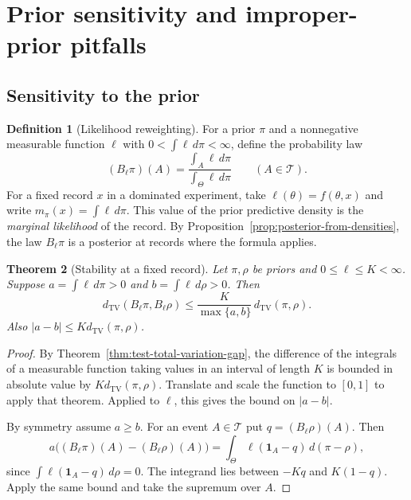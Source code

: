 \documentclass[11pt,oneside]{book}
\newtheorem{theorem}{Theorem}[chapter]
\theoremstyle{definition}
\newtheorem{definition}[theorem]{Definition}
\theoremstyle{remark}
\begin{document}
\section{Prior sensitivity and improper-prior pitfalls}
\label{sec:bayesian-prior-sensitivity}

\subsection{Sensitivity to the prior}
\label{subsec:bayesian-prior-sensitivity-tv}

\begin{definition}[Likelihood reweighting]
\label{def:bayesian-likelihood-reweighting}
For a prior $\pi$ and a nonnegative measurable function $\ell$
with $0<\int\ell\,d\pi<\infty$, define the probability law
\[
(B_\ell\pi)(A)=\frac{\int_A\ell\,d\pi}{\int_\Theta\ell\,d\pi}
\qquad(A\in\mathcal T).
\]
For a fixed record $x$ in a dominated experiment, take
$\ell(\theta)=f(\theta,x)$ and write $m_\pi(x)=\int\ell\,d\pi$.
This value of the prior predictive density is the
\emph{marginal likelihood} of the record. By
Proposition~\ref{prop:posterior-from-densities}, the law
$B_\ell\pi$ is a posterior at records where the formula applies.
\end{definition}

\begin{theorem}[Stability at a fixed record]
\label{thm:bayesian-prior-sensitivity-fixed}
Let $\pi,\rho$ be priors and $0\leq\ell\leq K<\infty$.
Suppose $a=\int\ell\,d\pi>0$ and $b=\int\ell\,d\rho>0$.
Then
\begin{equation}
d_{\mathrm{TV}}(B_\ell\pi,B_\ell\rho)
\leq \frac{K}{\max\{a,b\}}\,d_{\mathrm{TV}}(\pi,\rho).
\label{eq:bayesian-prior-sensitivity-fixed}
\end{equation}
Also $|a-b|\leq Kd_{\mathrm{TV}}(\pi,\rho)$.
\end{theorem}
\begin{proof}
By Theorem~\ref{thm:test-total-variation-gap}, the difference of
the integrals of a measurable function taking values in an
interval of length $K$ is bounded in absolute value by
$K d_{\mathrm{TV}}(\pi,\rho)$. Translate and scale the
function to $[0,1]$ to apply that theorem. Applied to $\ell$,
this gives the bound on $|a-b|$.

By symmetry assume $a\geq b$. For an event $A\in\mathcal T$ put
$q=(B_\ell\rho)(A)$. Then
\[
a\bigl((B_\ell\pi)(A)-(B_\ell\rho)(A)\bigr)
=\int_\Theta \ell(\mathbf 1_A-q)\,d(\pi-\rho),
\]
since $\int\ell(\mathbf 1_A-q)\,d\rho=0$. The integrand lies
between $-Kq$ and $K(1-q)$. Apply the same bound and take the
supremum over $A$.
\end{proof}
\end{document}
